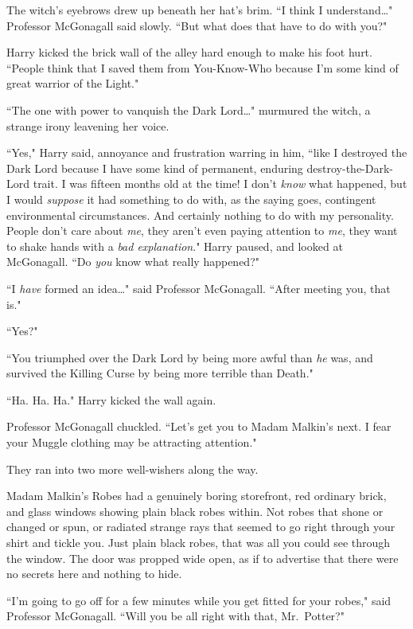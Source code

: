 The witch's eyebrows drew up beneath her hat's brim. ``I think I understand{\ldots}" Professor McGonagall said slowly. ``But what does that have to do with you?"

Harry kicked the brick wall of the alley hard enough to make his foot hurt. ``People think that I saved them from You-Know-Who because I'm some kind of great warrior of the Light."

``The one with power to vanquish the Dark Lord{\ldots}" murmured the witch, a strange irony leavening her voice.

``Yes," Harry said, annoyance and frustration warring in him, ``like I destroyed the Dark Lord because I have some kind of permanent, enduring destroy-the-Dark-Lord trait. I was fifteen months old at the time! I don't \emph{know} what happened, but I would \emph{suppose} it had something to do with, as the saying goes, contingent environmental circumstances. And certainly nothing to do with my personality. People don't care about \emph{me}, they aren't even paying attention to \emph{me}, they want to shake hands with a \emph{bad explanation}." Harry paused, and looked at McGonagall. ``Do \emph{you} know what really happened?"

``I \emph{have} formed an idea{\ldots}" said Professor McGonagall. ``After meeting you, that is."

``Yes?"

``You triumphed over the Dark Lord by being more awful than \emph{he} was, and survived the Killing Curse by being more terrible than Death."

``Ha. Ha. Ha." Harry kicked the wall again.

Professor McGonagall chuckled. ``Let's get you to Madam Malkin's next. I fear your Muggle clothing may be attracting attention."

They ran into two more well-wishers along the way.

Madam Malkin's Robes had a genuinely boring storefront, red ordinary brick, and glass windows showing plain black robes within. Not robes that shone or changed or spun, or radiated strange rays that seemed to go right through your shirt and tickle you. Just plain black robes, that was all you could see through the window. The door was propped wide open, as if to advertise that there were no secrets here and nothing to hide.

``I'm going to go off for a few minutes while you get fitted for your robes," said Professor McGonagall. ``Will you be all right with that, Mr.~Potter?"

